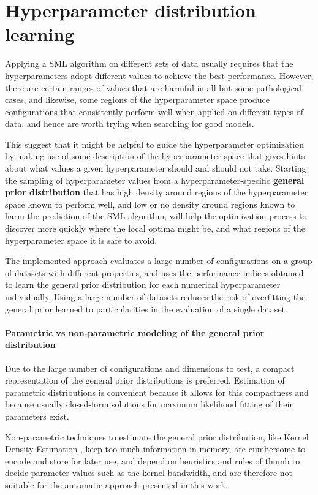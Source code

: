 \chapter{Hyperparameter distribution learning}
	\label{ch:learn}
	Applying a SML algorithm on different sets of data usually requires that the hyperparameters
	adopt different values to achieve the best performance. However, there are certain ranges of values
	that are harmful in all but some pathological cases, and likewise, some regions of the
	hyperparameter space produce configurations that consistently perform well when applied on
	different types of data, and hence are worth trying when searching for good models.

	This suggest that it might be helpful to guide the hyperparameter optimization by making use of
	some description of the hyperparameter space that gives hints about what values a given
	hyperparameter should and should not take. Starting the sampling of hyperparameter values from a
	hyperparameter-specific {\bf general prior distribution} that has high density around regions of
	the hyperparameter space known to perform well, and low or no density around regions known to
	harm the prediction of the SML algorithm, will help the optimization process to discover more
	quickly where the local optima might be, and what regions of the hyperparameter space it is safe
	to avoid.
	
	The implemented approach evaluates a large number of configurations on a group of datasets with
	different properties, and uses the performance indices obtained to learn the general prior
	distribution for each numerical hyperparameter individually. Using a large number of datasets
	reduces the risk of overfitting the general prior learned to particularities in the evaluation
	of a single dataset.

	\subsubsection{Parametric vs non-parametric modeling of the general prior distribution}

	Due to the large number of configurations and dimensions to test, a compact representation of
	the general prior distributions is preferred. Estimation of parametric distributions is
	convenient because it allows for this compactness and because usually closed-form solutions for
	maximum likelihood fitting of their parameters exist. 	

	Non-parametric techniques to estimate the general prior distribution, like Kernel Density Estimation
	\cite{rosenblatt1956kde}, \cite{parzen1962kde} keep too much information in memory, are cumbersome to
	encode and store for later use, and depend on heuristics and rules of thumb to decide parameter
	values such as the kernel bandwidth, and are therefore not suitable for the automatic approach
	presented in this work.

